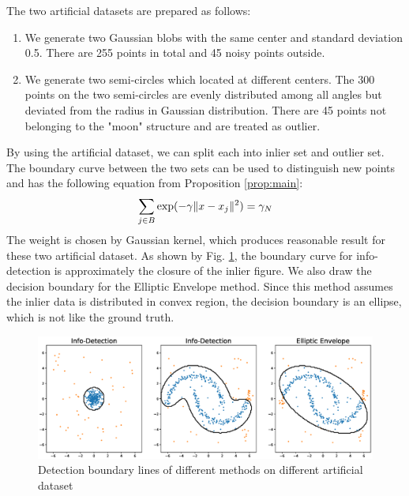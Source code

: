 \documentclass[runningheads]{llncs}
\begin{document}
The two artificial datasets are prepared as follows:
\begin{enumerate}
\item We generate two Gaussian blobs with the same center and standard deviation 0.5. There are 255 points in total and 45 noisy points outside.
\item We generate two semi-circles which located at different centers. The 300 points on the two semi-circles are evenly distributed among all angles but deviated from the radius in Gaussian distribution. There are 45 points not belonging to the "moon" structure and are treated as outlier.
\end{enumerate}

By using the artificial dataset, we can split each into inlier set and outlier set. The boundary curve between the two sets can be used to distinguish new points and has the following equation from Proposition \ref{prop:main}:
\begin{equation}
\sum_{j \in B} \exp(-\gamma \lVert x - x_j\rVert^2)= \gamma_N
\end{equation}
The weight is chosen by Gaussian kernel, which produces reasonable result for these two artificial dataset. As shown by Fig. \ref{fig:boundary}, the boundary curve for info-detection is approximately the closure of the inlier figure. We also draw the decision boundary for the Elliptic Envelope method. Since this method assumes the inlier data is distributed in convex region, the decision boundary is an ellipse, which is not like the ground truth.
\begin{figure}[!ht]
	\centering
	\includegraphics[width=\textwidth]{pic/outlier_boundary_illustration.eps}
	\caption{Detection boundary lines of different methods on different artificial dataset}	\label{fig:boundary}
\end{figure}
\end{document}
